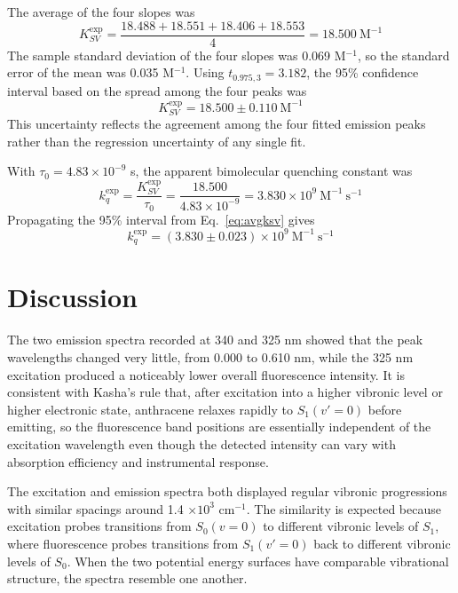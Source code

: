 \documentclass[12pt]{article}
\begin{document}
The average of the four slopes was
\begin{equation}
K_{SV}^{\mathrm{exp}} = \frac{18.488+18.551+18.406+18.553}{4} = 18.500\ \mathrm{M^{-1}}
\end{equation}
The sample standard deviation of the four slopes was 0.069 M$^{-1}$, so the standard error of the mean was 0.035 M$^{-1}$. Using $t_{0.975,3}=3.182$, the 95\% confidence interval based on the spread among the four peaks was
\begin{equation}
K_{SV}^{\mathrm{exp}} = 18.500 \pm 0.110\ \mathrm{M^{-1}}
\label{eq:avgksv}
\end{equation}
This uncertainty reflects the agreement among the four fitted emission peaks rather than the regression uncertainty of any single fit.

With $\tau_0 = 4.83\times10^{-9}$ s, the apparent bimolecular quenching constant was
\begin{equation}
k_q^{\mathrm{exp}} = \frac{K_{SV}^{\mathrm{exp}}}{\tau_0}
= \frac{18.500}{4.83\times10^{-9}}
= 3.830\times10^9\ \mathrm{M^{-1}\ s^{-1}}
\end{equation}
Propagating the 95\% interval from Eq.~\ref{eq:avgksv} gives
\begin{equation}
k_q^{\mathrm{exp}} = (3.830 \pm 0.023)\times10^9\ \mathrm{M^{-1}\ s^{-1}}
\end{equation}

\section*{Discussion}
The two emission spectra recorded at 340 and 325 nm showed that the peak wavelengths changed very little, from 0.000 to 0.610 nm, while the 325 nm excitation produced a noticeably lower overall fluorescence intensity. It is consistent with Kasha's rule that, after excitation into a higher vibronic level or higher electronic state, anthracene relaxes rapidly to $S_1(v'=0)$ before emitting, so the fluorescence band positions are essentially independent of the excitation wavelength even though the detected intensity can vary with absorption efficiency and instrumental response.\cite{lab_manual}

The excitation and emission spectra both displayed regular vibronic progressions with similar spacings around 1.4 $\times 10^3$ cm$^{-1}$. The similarity is expected because excitation probes transitions from $S_0(v=0)$ to different vibronic levels of $S_1$, where fluorescence probes transitions from $S_1(v'=0)$ back to different vibronic levels of $S_0$. When the two potential energy surfaces have comparable vibrational structure, the spectra resemble one another.
\end{document}
